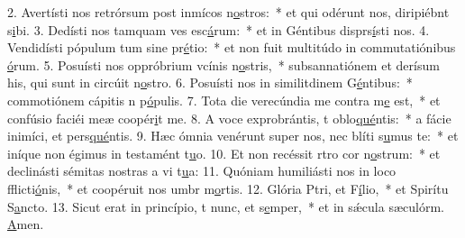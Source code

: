 2. Avertísti nos retrórsum post inmícos n\uline{o}stros:~* et qui odérunt nos, diripiébnt s\uline{i}bi.
3. Dedísti nos tamquam ves esc\uline{á}rum:~* et in Géntibus disprs\uline{í}sti nos.
4. Vendidísti pópulum tum sine pr\uline{é}tio:~* et non fuit multitúdo in commutatiónibus \uline{ó}rum.
5. Posuísti nos oppróbrium vcínis n\uline{o}stris,~* subsannatiónem et derísum his, qui sunt in circúit n\uline{o}stro.
6. Posuísti nos in similitdinem G\uline{é}ntibus:~* commotiónem cápitis n p\uline{ó}pulis.
7. Tota die verecúndia me contra m\uline{e} est,~* et confúsio faciéi meæ coopér\uline{i}t me.
8. A voce exprobrántis, t oblo\uline{qué}ntis:~* a fácie inimíci, et pers\uline{qué}ntis.
9. Hæc ómnia venérunt super nos, nec blíti s\uline{u}mus te:~* et iníque non égimus in testamént t\uline{u}o.
10. Et non recéssit rtro cor n\uline{o}strum:~* et declinásti sémitas nostras a vi t\uline{u}a:
11. Quóniam humiliásti nos in loco fflicti\uline{ó}nis,~* et coopéruit nos umbr m\uline{o}rtis.
12. Glória Ptri, et F\uline{í}lio,~* et Spirítu S\uline{a}ncto.
13. Sicut erat in princípio, t nunc, et s\uline{e}mper,~* et in sǽcula sæculórm. \uline{A}men.

